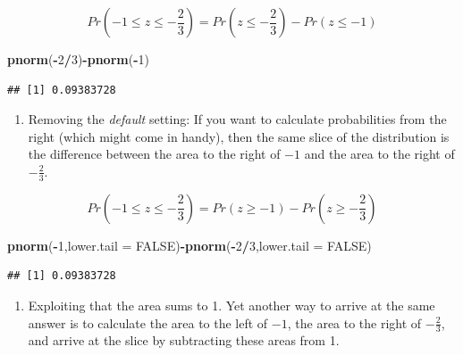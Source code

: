 \documentclass[
]{book}
\newenvironment{Shaded}{\begin{snugshade}}{\end{snugshade}}
\newcommand{\AttributeTok}[1]{\textcolor[rgb]{0.13,0.29,0.53}{#1}}
\newcommand{\ConstantTok}[1]{\textcolor[rgb]{0.56,0.35,0.01}{#1}}
\newcommand{\DecValTok}[1]{\textcolor[rgb]{0.00,0.00,0.81}{#1}}
\newcommand{\FunctionTok}[1]{\textcolor[rgb]{0.13,0.29,0.53}{\textbf{#1}}}
\newcommand{\NormalTok}[1]{#1}
\newcommand{\SpecialCharTok}[1]{\textcolor[rgb]{0.81,0.36,0.00}{\textbf{#1}}}
\providecommand{\tightlist}{%
  \setlength{\itemsep}{0pt}\setlength{\parskip}{0pt}}
\begin{document}
\[Pr\left(-1 \leq z \leq -\frac{2}{3}\right)=Pr\left(z \leq -\frac{2}{3}\right) - Pr\left(z \leq -1\right)\]

\begin{Shaded}
\begin{Highlighting}[]
\FunctionTok{pnorm}\NormalTok{(}\SpecialCharTok{{-}}\DecValTok{2}\SpecialCharTok{/}\DecValTok{3}\NormalTok{)}\SpecialCharTok{{-}}\FunctionTok{pnorm}\NormalTok{(}\SpecialCharTok{{-}}\DecValTok{1}\NormalTok{)}
\end{Highlighting}
\end{Shaded}

\begin{verbatim}
## [1] 0.09383728
\end{verbatim}

\begin{enumerate}
\def\labelenumi{\arabic{enumi}.}
\setcounter{enumi}{1}
\tightlist
\item
  Removing the \emph{default} setting: If you want to calculate probabilities from the right (which might come in handy), then the same slice of the distribution is the difference between the area to the right of \(-1\) and the area to the right of \(-\frac{2}{3}\).
\end{enumerate}

\[Pr\left(-1 \leq z \leq -\frac{2}{3}\right)=Pr(z \geq -1) - Pr\left(z \geq -\frac{2}{3}\right)\]

\begin{Shaded}
\begin{Highlighting}[]
\FunctionTok{pnorm}\NormalTok{(}\SpecialCharTok{{-}}\DecValTok{1}\NormalTok{,}\AttributeTok{lower.tail =} \ConstantTok{FALSE}\NormalTok{)}\SpecialCharTok{{-}}\FunctionTok{pnorm}\NormalTok{(}\SpecialCharTok{{-}}\DecValTok{2}\SpecialCharTok{/}\DecValTok{3}\NormalTok{,}\AttributeTok{lower.tail =} \ConstantTok{FALSE}\NormalTok{)}
\end{Highlighting}
\end{Shaded}

\begin{verbatim}
## [1] 0.09383728
\end{verbatim}

\begin{enumerate}
\def\labelenumi{\arabic{enumi}.}
\setcounter{enumi}{2}
\tightlist
\item
  Exploiting that the area sums to 1. Yet another way to arrive at the same answer is to calculate the area to the left of \(-1\), the area to the right of \(-\frac{2}{3}\), and arrive at the slice by subtracting these areas from 1.
\end{enumerate}
\end{document}
